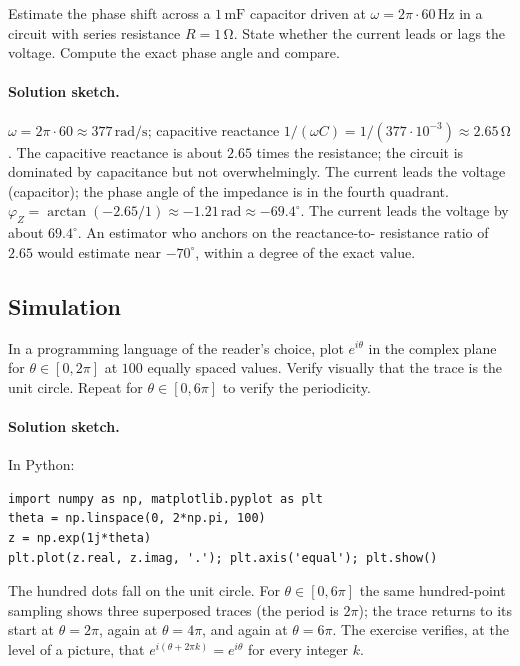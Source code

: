 \begin{exercise}
Estimate the phase shift across a $1 \,\si{\milli\farad}$
capacitor driven at $\omega = 2\pi \cdot 60 \,\si{\hertz}$ in a
circuit with series resistance $R = 1 \,\si{\ohm}$. State whether
the current leads or lags the voltage. Compute the exact phase
angle and compare.

\paragraph{Solution sketch.}
$\omega = 2\pi \cdot 60 \approx 377\,\si{\radian\per\second}$;
capacitive reactance $1/(\omega C) = 1/(377 \cdot 10^{-3}) \approx
2.65\,\si{\ohm}$. The capacitive reactance is about $2.65$ times
the resistance; the circuit is dominated by capacitance but not
overwhelmingly. The current leads the voltage (capacitor); the
phase angle of the impedance is in the fourth quadrant.
$\varphi_{Z} = \arctan(-2.65/1) \approx -1.21\,\text{rad} \approx
-69.4^{\circ}$. The current leads the voltage by about
$69.4^{\circ}$. An estimator who anchors on the reactance-to-
resistance ratio of $2.65$ would estimate near $-70^{\circ}$,
within a degree of the exact value.
\end{exercise}

\subsection*{Simulation}

\begin{exercise}
In a programming language of the reader's choice, plot $e^{i\theta}$
in the complex plane for $\theta \in [0, 2\pi]$ at $100$ equally
spaced values. Verify visually that the trace is the unit circle.
Repeat for $\theta \in [0, 6\pi]$ to verify the periodicity.

\paragraph{Solution sketch.}
In Python:
\begin{verbatim}
import numpy as np, matplotlib.pyplot as plt
theta = np.linspace(0, 2*np.pi, 100)
z = np.exp(1j*theta)
plt.plot(z.real, z.imag, '.'); plt.axis('equal'); plt.show()
\end{verbatim}
The hundred dots fall on the unit circle. For $\theta \in [0,
6\pi]$ the same hundred-point sampling shows three superposed
traces (the period is $2\pi$); the trace returns to its start at
$\theta = 2\pi$, again at $\theta = 4\pi$, and again at $\theta =
6\pi$. The exercise verifies, at the level of a picture, that
$e^{i(\theta + 2\pi k)} = e^{i\theta}$ for every integer $k$.
\end{exercise}

